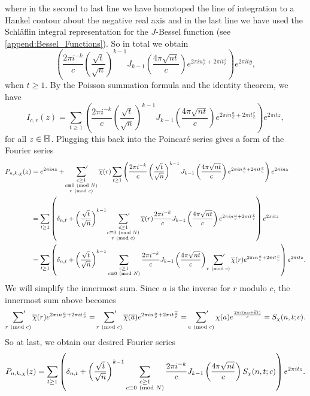     where in the second to last line we have homotoped the line of integration to a Hankel contour about the negative real axis and in the last line we have used the Schl\"aflin integral representation for the $J$-Bessel function (see \cref{append:Bessel_Functions}). So in total we obtain
    \[
      \left(\frac{2\pi i^{-k}}{c}\left(\frac{\sqrt{t}}{\sqrt{n}}\right)^{k-1}J_{k-1}\left(\frac{4\pi\sqrt{nt}}{c}\right)e^{2\pi in\frac{a}{c}+2\pi it\frac{r}{c}}\right)e^{2\pi ity},
    \]
    when $t \ge 1$. By the Poisson summation formula and the identity theorem, we have
    \[
      I_{c,r}(z) = \sum_{t \ge 1}\left(\frac{2\pi i^{-k}}{c}\left(\frac{\sqrt{t}}{\sqrt{n}}\right)^{k-1}J_{k-1}\left(\frac{4\pi\sqrt{nt}}{c}\right)e^{2\pi in\frac{a}{c}+2\pi it\frac{r}{c}}\right)e^{2\pi itz},
    \]
    for all $z \in \mathbb{H}$. Plugging this back into the Poincar\'e series gives a form of the Fourier series
    \begin{align*}
      P_{n,k,\chi}(z) &= e^{2\pi inz}+\sideset{}{'}\sum_{\substack{c \ge 1 \\ c \equiv 0 \ \left(\text{mod }N\right) \\ r \ \left(\text{mod }c\right)}}\overline{\chi}(r)\sum_{t \ge 1}\left(\frac{2\pi i^{-k}}{c}\left(\frac{\sqrt{t}}{\sqrt{n}}\right)^{k-1}J_{k-1}\left(\frac{4\pi\sqrt{nt}}{c}\right)e^{2\pi in\frac{a}{c}+2\pi it\frac{r}{c}}\right)e^{2\pi inz} \\
      &= \sum_{t \ge 1}\left(\delta_{n,t}+\left(\frac{\sqrt{t}}{\sqrt{n}}\right)^{k-1}\sideset{}{'}\sum_{\substack{c \ge 1 \\ c \equiv 0 \ \left(\text{mod }N\right) \\ r \ \left(\text{mod }c\right)}}\overline{\chi}(r)\frac{2\pi i^{-k}}{c}J_{k-1}\left(\frac{4\pi\sqrt{nt}}{c}\right)e^{2\pi in\frac{a}{c}+2\pi it\frac{r}{c}}\right)e^{2\pi itz} \\
      &= \sum_{t \ge 1}\left(\delta_{n,t}+\left(\frac{\sqrt{t}}{\sqrt{n}}\right)^{k-1}\sum_{\substack{c \ge 1 \\ c \equiv 0 \ \left(\text{mod }N\right)}}\frac{2\pi i^{-k}}{c}J_{k-1}\left(\frac{4\pi\sqrt{nt}}{c}\right)\sideset{}{'}\sum_{r \ \left(\text{mod }c\right)}\overline{\chi}(r)e^{2\pi in\frac{a}{c}+2\pi it\frac{r}{c}}\right)e^{2\pi itz}.
    \end{align*}
    We will simplify the innermost sum. Since $a$ is the inverse for $r$ modulo $c$, the innermost sum above becomes
    \[
      \sideset{}{'}\sum_{r \ \left(\text{mod }c\right)}\overline{\chi}(r)e^{2\pi in\frac{a}{c}+2\pi it\frac{r}{c}} = \sideset{}{'}\sum_{r \ \left(\text{mod }c\right)}\overline{\chi}(\overline{a})e^{2\pi in\frac{a}{c}+2\pi it\frac{\overline{a}}{c}} = \sideset{}{'}\sum_{a \ \left(\text{mod }c\right)}\chi(a)e^{\frac{2\pi i(an+\overline{a}t)}{c}} = S_{\chi}(n,t;c).
    \]
    So at last, we obtain our desired Fourier series
    \[
      P_{n,k,\chi}(z) = \sum_{t \ge 1}\left(\delta_{n,t}+\left(\frac{\sqrt{t}}{\sqrt{n}}\right)^{k-1}\sum_{\substack{c \ge 1 \\ c \equiv 0 \ \left(\text{mod }N\right)}}\frac{2\pi i^{-k}}{c}J_{k-1}\left(\frac{4\pi\sqrt{nt}}{c}\right)S_{\chi}(n,t;c)\right)e^{2\pi itz}.
    \]
